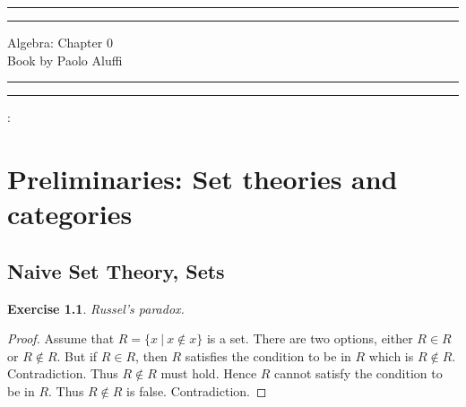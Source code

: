 \documentclass[a4paper, 11pt]{book}
\theoremstyle{plain}
\newtheorem{exercise}[theorem]{Exercise}
\theoremstyle{plain}
\begin{document}
  \begin{titlepage}
	\centering %
	\scshape %
	\vspace*{1.5\baselineskip} %

	\rule{13cm}{1.6pt}\vspace*{-\baselineskip}\vspace*{2pt} %
	\rule{13cm}{0.4pt} %
	
		\vspace{0.75\baselineskip} %
	{	\Huge Algebra: Chapter 0\\ 
			\vspace{4mm}
		Book by Paolo Aluffi \\	}
		\vspace{0.75\baselineskip} %
	\rule{13cm}{0.4pt}\vspace*{-\baselineskip}\vspace{3.2pt} %
	\rule{13cm}{1.6pt} %
	
		\vspace{1.75\baselineskip} %
	{\large : 
		\vspace*{1.2\baselineskip}
	} \\
	\vfill

\end{titlepage}
\begingroup
\let\cleardoublepage\clearpage
\tableofcontents
\endgroup


\chapter{Preliminaries: Set theories and categories}
  \section{Naive Set Theory, Sets}
    \begin{exercise}
      Russel's paradox.
    \end{exercise}
    \begin{proof}
      Assume that $R = \{x~\vert~x\notin x\}$ is a set. There are two options, either $R\in R$ or $R\notin R$. But if $R\in R$, then $R$ satisfies the condition to be in $R$ which is $R\notin R$. Contradiction. Thus $R\notin R$ must hold. Hence $R$ cannot satisfy the condition to be in $R$. Thus $R\notin R$ is false. Contradiction.
    \end{proof}
  
\end{document}
